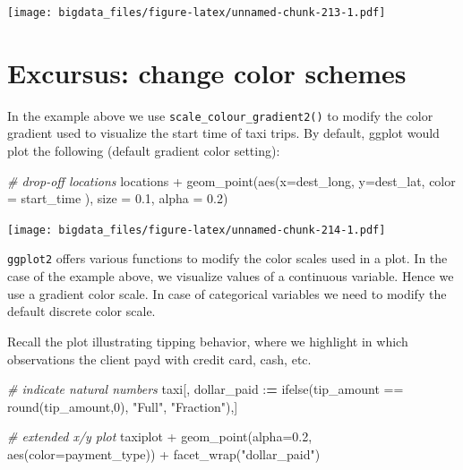 \documentclass[
  12pt,
]{style/krantz}
\newenvironment{Shaded}{\begin{snugshade}}{\end{snugshade}}
\newcommand{\AttributeTok}[1]{\textcolor[rgb]{0.77,0.63,0.00}{#1}}
\newcommand{\CommentTok}[1]{\textcolor[rgb]{0.56,0.35,0.01}{\textit{#1}}}
\newcommand{\DecValTok}[1]{\textcolor[rgb]{0.00,0.00,0.81}{#1}}
\newcommand{\ErrorTok}[1]{\textcolor[rgb]{0.64,0.00,0.00}{\textbf{#1}}}
\newcommand{\FloatTok}[1]{\textcolor[rgb]{0.00,0.00,0.81}{#1}}
\newcommand{\FunctionTok}[1]{\textcolor[rgb]{0.00,0.00,0.00}{#1}}
\newcommand{\NormalTok}[1]{#1}
\newcommand{\SpecialCharTok}[1]{\textcolor[rgb]{0.00,0.00,0.00}{#1}}
\newcommand{\StringTok}[1]{\textcolor[rgb]{0.31,0.60,0.02}{#1}}
\begin{document}
\texttt{[image: bigdata\_files/figure-latex/unnamed-chunk-213-1.pdf]}

\hypertarget{excursus-change-color-schemes}{%
\section{Excursus: change color schemes}\label{excursus-change-color-schemes}}

In the example above we use \texttt{scale\_colour\_gradient2()} to modify the color gradient used to visualize the start time of taxi trips. By default, ggplot would plot the following (default gradient color setting):

\begin{Shaded}
\begin{Highlighting}[]
\CommentTok{\# drop{-}off locations }
\NormalTok{locations }\SpecialCharTok{+}
     \FunctionTok{geom\_point}\NormalTok{(}\FunctionTok{aes}\NormalTok{(}\AttributeTok{x=}\NormalTok{dest\_long, }\AttributeTok{y=}\NormalTok{dest\_lat, }\AttributeTok{color =}\NormalTok{ start\_time ),}
                \AttributeTok{size =} \FloatTok{0.1}\NormalTok{,}
                \AttributeTok{alpha =} \FloatTok{0.2}\NormalTok{) }
\end{Highlighting}
\end{Shaded}

\texttt{[image: bigdata\_files/figure-latex/unnamed-chunk-214-1.pdf]}

\texttt{ggplot2} offers various functions to modify the color scales used in a plot. In the case of the example above, we visualize values of a continuous variable. Hence we use a gradient color scale. In case of categorical variables we need to modify the default discrete color scale.

Recall the plot illustrating tipping behavior, where we highlight in which observations the client payd with credit card, cash, etc.

\begin{Shaded}
\begin{Highlighting}[]
\CommentTok{\# indicate natural numbers}
\NormalTok{taxi[, dollar\_paid }\SpecialCharTok{:}\ErrorTok{=} \FunctionTok{ifelse}\NormalTok{(tip\_amount }\SpecialCharTok{==} \FunctionTok{round}\NormalTok{(tip\_amount,}\DecValTok{0}\NormalTok{), }\StringTok{"Full"}\NormalTok{, }\StringTok{"Fraction"}\NormalTok{),]}


\CommentTok{\# extended x/y plot}
\NormalTok{taxiplot }\SpecialCharTok{+}
     \FunctionTok{geom\_point}\NormalTok{(}\AttributeTok{alpha=}\FloatTok{0.2}\NormalTok{, }\FunctionTok{aes}\NormalTok{(}\AttributeTok{color=}\NormalTok{payment\_type)) }\SpecialCharTok{+}
     \FunctionTok{facet\_wrap}\NormalTok{(}\StringTok{"dollar\_paid"}\NormalTok{)}
\end{Highlighting}
\end{Shaded}
\end{document}
